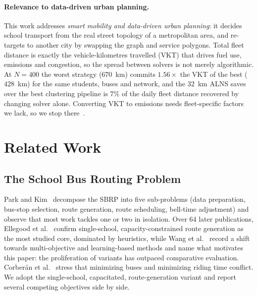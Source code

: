 \documentclass[graybox]{SNmult}
\begin{document}
\paragraph{Relevance to data-driven urban planning.}
This work addresses \emph{smart mobility and data-driven urban planning}:
it decides school transport from the real street topology of a
metropolitan area, and re-targets to another city by swapping the graph
and service polygons. Total fleet distance is exactly the
vehicle-kilometres travelled (VKT) that drives fuel use, emissions and
congestion, so the spread between solvers is not merely algorithmic. At
$N=400$ the worst strategy ($670$~km) commits $1.56\times$ the VKT of the
best ($428$~km) for the same students, buses and network, and the $32$~km
ALNS saves over the best clustering pipeline is $7\%$ of the daily fleet
distance recovered by changing solver alone. Converting VKT to emissions
needs fleet-specific factors we lack, so we stop
there~\cite{Sabet2022GreenVRP}.

\section{Related Work}\label{sec:related}
\subsection{The School Bus Routing Problem}
Park and Kim~\cite{Park2010TheReview} decompose the SBRP into five
sub-problems (data preparation, bus-stop selection, route generation,
route scheduling, bell-time adjustment) and observe that most work tackles
one or two in isolation. Over 64 later publications, Ellegood et
al.~\cite{Ellegood2020SchoolDirections} confirm single-school,
capacity-constrained route generation as the most studied core, dominated
by heuristics, while Wang et al.~\cite{Wang2025SBRPReview} record a shift
towards multi-objective and learning-based methods and name what motivates
this paper: the proliferation of variants has outpaced comparative
evaluation. Corber\'an et al.~\cite{Corberan2002HeuristicObjectives}
stress that minimizing buses and minimizing riding time conflict. We adopt
the single-school, capacitated, route-generation variant and report
several competing objectives side by side.
\end{document}
